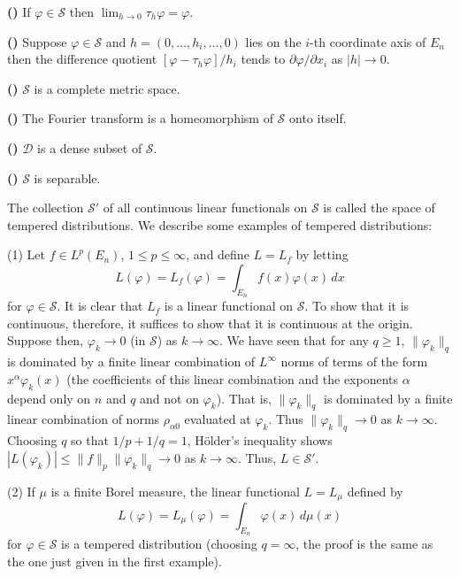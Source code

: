 \label{eq:c1-3-5}\textbf{(\theequation)}\quad
If $\varphi \in \mathscr{S}$ then $\lim_{h \to 0} \tau_{h}\varphi = \varphi$.

\label{eq:c1-3-6}\textbf{(\theequation)}\quad
Suppose $\varphi \in \mathscr{S}$ and $h = (0, \ldots, h_{i}, \ldots, 0)$ lies
on the $i$-th coordinate axis of $E_{n}$ then the difference quotient
$[\varphi - \tau_{h}\varphi]/h_{i}$ tends to $\partial\varphi/\partial x_{i}$
as $|h| \to 0$.

\label{eq:c1-3-7}\textbf{(\theequation)}\quad
$\mathscr{S}$ is a complete metric space.

\label{eq:c1-3-8}\textbf{(\theequation)}\quad
The Fourier transform is a homeomorphism of $\mathscr{S}$ onto itself.

\label{eq:c1-3-9}\textbf{(\theequation)}\quad
$\mathscr{D}$ is a dense subset of $\mathscr{S}$.

\label{eq:c1-3-10}\textbf{(\theequation)}\quad
$\mathscr{S}$ is separable.

The collection $\mathscr{S}'$ of all continuous linear functionals on
$\mathscr{S}$ is called the space of tempered distributions. We describe some
examples of tempered distributions:

\textup{(1)} Let $f \in L^{p}(E_{n})$, $1 \leq p \leq \infty$, and define
$L = L_{f}$ by letting
\[
L(\varphi)=L_{f}(\varphi)=\int_{E_{n}}f(x)\varphi(x)\,dx
\]
for $\varphi \in \mathscr{S}$. It is clear that $L_{f}$ is a linear functional
on $\mathscr{S}$. To show that it is continuous, therefore, it suffices to
show that it is continuous at the origin. Suppose then, $\varphi_{k} \to 0$
(in $\mathscr{S}$) as $k \to \infty$. We have seen that for any $q \geq 1$,
$\|\varphi_{k}\|_{q}$ is dominated by a finite linear combination of
$L^{\infty}$ norms of terms of the form $x^{\alpha}\varphi_{k}(x)$ (the
coefficients of this linear combination and the exponents $\alpha$ depend only
on $n$ and $q$ and not on $\varphi_{k}$). That is, $\|\varphi_{k}\|_{q}$ is
dominated by a finite linear combination of norms $\rho_{\alpha 0}$ evaluated
at $\varphi_{k}$. Thus $\|\varphi_{k}\|_{q} \to 0$ as $k \to \infty$.
Choosing $q$ so that $1/p + 1/q = 1$, H\"older's inequality shows
$|L(\varphi_{k})| \leq \|f\|_{p}\|\varphi_{k}\|_{q} \to 0$ as $k \to \infty$.
Thus, $L \in \mathscr{S}'$.

\textup{(2)} If $\mu$ is a finite Borel measure, the linear functional
$L = L_{\mu}$ defined by
\[
L(\varphi)=L_{\mu}(\varphi)=\int_{E_{n}}\varphi(x)\,d\mu(x)
\]
for $\varphi \in \mathscr{S}$ is a tempered distribution (choosing
$q = \infty$, the proof is the same as the one just given in the first
example).


